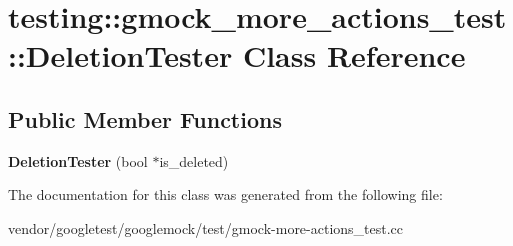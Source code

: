 \hypertarget{classtesting_1_1gmock__more__actions__test_1_1_deletion_tester}{}\section{testing\+:\+:gmock\+\_\+more\+\_\+actions\+\_\+test\+:\+:Deletion\+Tester Class Reference}
\label{classtesting_1_1gmock__more__actions__test_1_1_deletion_tester}
\subsection*{Public Member Functions}
\begin{DoxyCompactItemize}
\item 
\mbox{\label{classtesting_1_1gmock__more__actions__test_1_1_deletion_tester_a3b9670fc6d29cb9d120fb0fdd2ba68d8}} 
{\bfseries Deletion\+Tester} (bool $\ast$is\+\_\+deleted)
\end{DoxyCompactItemize}


The documentation for this class was generated from the following file\+:\begin{DoxyCompactItemize}
\item 
vendor/googletest/googlemock/test/gmock-\/more-\/actions\+\_\+test.\+cc\end{DoxyCompactItemize}
